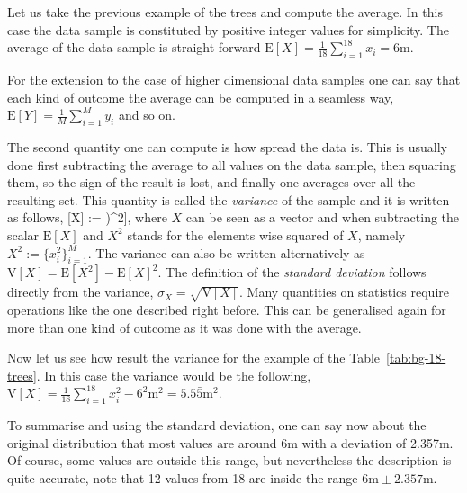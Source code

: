 Let us take the previous example of the trees and compute the average.
In this case the data sample is constituted by positive integer values for simplicity.
The average of the data sample is straight forward $\text{E}[X] = \frac{1}{18}\sum_{i=1}^{18} x_i = 6\text{m}$.

For the extension to the case of higher dimensional data samples one can say that each kind of outcome the average can be computed in a seamless way, $\text{E}[Y]=\frac{1}{M}\sum_{i=1}^M y_i$ and so on.


The second quantity one can compute is how spread the data is.
This is usually done first subtracting the average to all values on the data sample, then squaring them, so the sign of the result is lost, and finally one averages over all the resulting set. This quantity is called the \emph{variance} of the sample and it is written as follows,
\be
  [X] := \left[(X- \text{E}[X])^2\right],
\ee
where $X$ can be seen as a vector and when subtracting the scalar $\text{E}[X]$ and $X^2$ stands for the elements wise squared of $X$, namely $X^2 := \{x_i^2\}_{i=1}^M$.
The variance can also be written alternatively as $\text{V}[X] = \text{E}[X^2]- \text{E}[X]^2$.
The definition of the \emph{standard deviation} follows directly from the variance, $\sigma_{X}=\sqrt{\text{V}[X]}$.
Many quantities on statistics require operations like the one described right before.
This can be generalised again for more than one kind of outcome as it was done with the average.

Now let us see how result the variance for the example of the Table~\ref{tab:bg-18-trees}.
In this case the variance would be the following, $\text{V}[X]=\frac{1}{18}\sum_{i=1}^{18}x_i^2 - 6^2\text{m}^2 = 5.5\bar{5}\text{m}^2$.

To summarise and using the standard deviation, one can say now about the original distribution that most values are around 6m with a deviation of 2.357m.
Of course, some values are outside this range, but nevertheless the description is quite accurate, note that 12 values from 18 are inside the range $6\text{m}\pm2.357\text{m}$.


